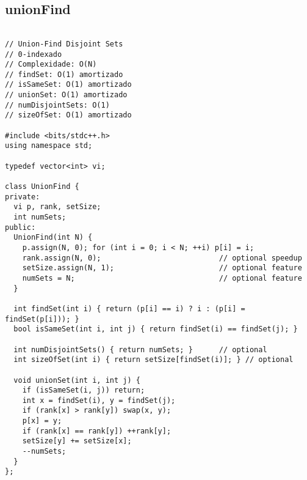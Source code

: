 \documentclass[landscape,twocolumn,10pt,a4paper]{article}
\begin{document}
\subsection{unionFind}
\begin{verbatim}

// Union-Find Disjoint Sets
// 0-indexado
// Complexidade: O(N)
// findSet: O(1) amortizado
// isSameSet: O(1) amortizado
// unionSet: O(1) amortizado
// numDisjointSets: O(1)
// sizeOfSet: O(1) amortizado

#include <bits/stdc++.h>
using namespace std;

typedef vector<int> vi;

class UnionFind {
private:
  vi p, rank, setSize;
  int numSets;
public:
  UnionFind(int N) {
    p.assign(N, 0); for (int i = 0; i < N; ++i) p[i] = i;
    rank.assign(N, 0);                           // optional speedup
    setSize.assign(N, 1);                        // optional feature
    numSets = N;                                 // optional feature
  }

  int findSet(int i) { return (p[i] == i) ? i : (p[i] = findSet(p[i])); }
  bool isSameSet(int i, int j) { return findSet(i) == findSet(j); }

  int numDisjointSets() { return numSets; }      // optional
  int sizeOfSet(int i) { return setSize[findSet(i)]; } // optional

  void unionSet(int i, int j) {
    if (isSameSet(i, j)) return;
    int x = findSet(i), y = findSet(j);
    if (rank[x] > rank[y]) swap(x, y);
    p[x] = y;
    if (rank[x] == rank[y]) ++rank[y];
    setSize[y] += setSize[x];
    --numSets;
  }
};


\end{verbatim}
\end{document}
